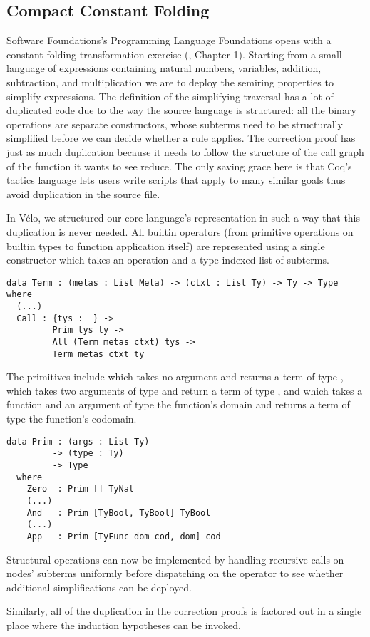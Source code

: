 
\subsection{Compact Constant Folding}
\label{sec:design:constants}

Software Foundations's Programming Language Foundations
opens with a constant-folding transformation
exercise (\cite{Pierce:SF2}, Chapter 1).
%
Starting from a small language of expressions containing natural numbers,
variables, addition, subtraction, and multiplication we are to deploy the
semiring properties to simplify expressions.
%
The definition of the simplifying traversal has a lot of duplicated code
due to the way the source language is structured: all the binary operations
are separate constructors, whose subterms need to be structurally simplified
before we can decide whether a rule applies.
%
The correction proof has just as much duplication because it needs to follow
the structure of the call graph of the function it wants to see reduce.
%
The only saving grace here is that Coq's tactics language lets users write
scripts that apply to many similar goals thus avoid duplication in the source
file.

In Vélo, we structured our core language's representation in such a way that
this duplication is never needed.
%
All builtin operators (from primitive operations on builtin types to function
application itself) are represented using a single  constructor
which takes an operation and a type-indexed list of subterms.

\begin{verbatim}
data Term : (metas : List Meta) -> (ctxt : List Ty) -> Ty -> Type where
  (...)
  Call : {tys : _} ->
         Prim tys ty ->
         All (Term metas ctxt) tys ->
         Term metas ctxt ty
\end{verbatim}

The primitives include
%
 which takes no argument and returns a term of type ,
%
 which takes two arguments of type  and return a term
of type ,
%
and  which takes a function and an argument of type the function's domain
and returns a term of type the function's codomain.

\begin{verbatim}
data Prim : (args : List Ty)
         -> (type : Ty)
         -> Type
  where
    Zero  : Prim [] TyNat
    (...)
    And   : Prim [TyBool, TyBool] TyBool
    (...)
    App   : Prim [TyFunc dom cod, dom] cod
\end{verbatim}

Structural operations can now be implemented by handling
recursive calls on  nodes' subterms uniformly
before dispatching on the operator to see whether additional
simplifications can be deployed.

Similarly, all of the duplication in the correction proofs is
factored out in a single place where the induction hypotheses
can be invoked.

